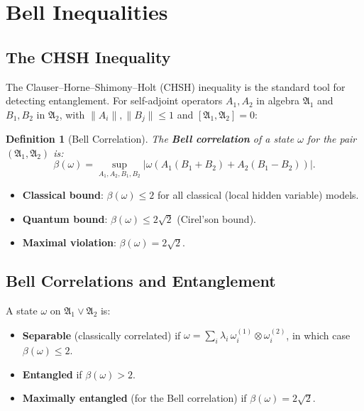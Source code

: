 \documentclass[11pt,a4paper]{article}
\newtheorem{definition}{Definition}[section]
\begin{document}
\section{Bell Inequalities}

\subsection{The CHSH Inequality}

The Clauser--Horne--Shimony--Holt (CHSH) inequality is the standard
tool for detecting entanglement. For self-adjoint operators $A_1, A_2$
in algebra $\mathfrak{A}_1$ and $B_1, B_2$ in $\mathfrak{A}_2$, with
$\|A_i\|, \|B_j\| \leq 1$ and $[\mathfrak{A}_1, \mathfrak{A}_2] = 0$:

\begin{definition}[Bell Correlation]
The \textbf{Bell correlation} of a state $\omega$ for the pair
$(\mathfrak{A}_1, \mathfrak{A}_2)$ is:
\begin{equation}
  \beta(\omega) = \sup_{A_1, A_2, B_1, B_2}
  \bigl|\omega(A_1(B_1 + B_2) + A_2(B_1 - B_2))\bigr|.
\end{equation}
\end{definition}

\begin{itemize}[nosep]
  \item \textbf{Classical bound}: $\beta(\omega) \leq 2$ for all
        classical (local hidden variable) models.
  \item \textbf{Quantum bound}: $\beta(\omega) \leq 2\sqrt{2}$
        (Cirel'son bound).
  \item \textbf{Maximal violation}: $\beta(\omega) = 2\sqrt{2}$.
\end{itemize}

\subsection{Bell Correlations and Entanglement}

A state $\omega$ on $\mathfrak{A}_1 \vee \mathfrak{A}_2$ is:
\begin{itemize}[nosep]
  \item \textbf{Separable} (classically correlated) if
        $\omega = \sum_i \lambda_i\, \omega_i^{(1)} \otimes \omega_i^{(2)}$,
        in which case $\beta(\omega) \leq 2$.
  \item \textbf{Entangled} if $\beta(\omega) > 2$.
  \item \textbf{Maximally entangled} (for the Bell correlation) if
        $\beta(\omega) = 2\sqrt{2}$.
\end{itemize}
\end{document}
